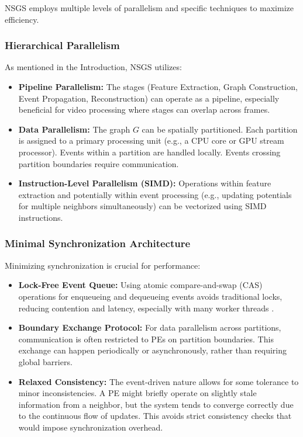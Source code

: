 \documentclass[conference]{IEEEtran}
\begin{document}
NSGS employs multiple levels of parallelism and specific techniques to maximize efficiency.

\subsubsection{Hierarchical Parallelism}
As mentioned in the Introduction, NSGS utilizes:
\begin{itemize}
    \item \textbf{Pipeline Parallelism:} The stages (Feature Extraction, Graph Construction, Event Propagation, Reconstruction) can operate as a pipeline, especially beneficial for video processing where stages can overlap across frames.
    \item \textbf{Data Parallelism:} The graph \(G\) can be spatially partitioned. Each partition is assigned to a primary processing unit (e.g., a CPU core or GPU stream processor). Events within a partition are handled locally. Events crossing partition boundaries require communication.
    \item \textbf{Instruction-Level Parallelism (SIMD):} Operations within feature extraction and potentially within event processing (e.g., updating potentials for multiple neighbors simultaneously) can be vectorized using SIMD instructions.
\end{itemize}

\subsubsection{Minimal Synchronization Architecture} \label{subsubsec:sync_architecture}
Minimizing synchronization is crucial for performance:
\begin{itemize}
    \item \textbf{Lock-Free Event Queue:} Using atomic compare-and-swap (CAS) operations for enqueueing and dequeueing events avoids traditional locks, reducing contention and latency, especially with many worker threads \cite{Chase2005}.
    \item \textbf{Boundary Exchange Protocol:} For data parallelism across partitions, communication is often restricted to PEs on partition boundaries. This exchange can happen periodically or asynchronously, rather than requiring global barriers.
    \item \textbf{Relaxed Consistency:} The event-driven nature allows for some tolerance to minor inconsistencies. A PE might briefly operate on slightly stale information from a neighbor, but the system tends to converge correctly due to the continuous flow of updates. This avoids strict consistency checks that would impose synchronization overhead.
\end{itemize}
\end{document}
